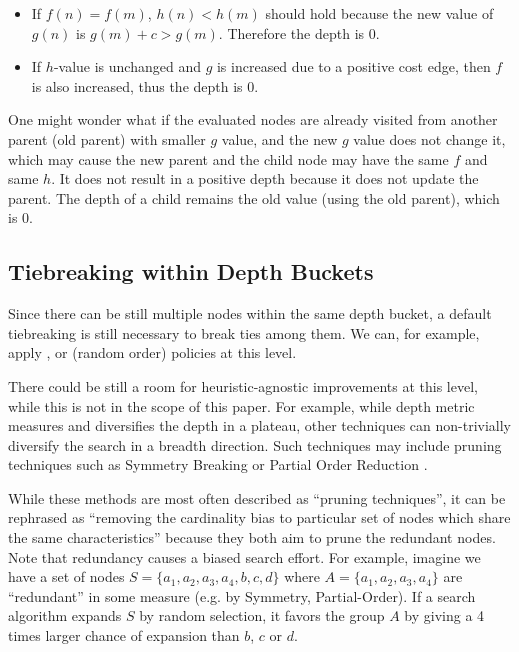\begin{itemize}
 \item 
       If $f(n)=f(m)$, $h(n)<h(m)$ should hold because the new value of
       $g(n)$ is $g(m)+c>g(m)$. Therefore the depth is 0.
 \item If $h$-value is unchanged and $g$ is increased due to a positive
       cost edge, then $f$ is also increased, thus the depth is 0.
\end{itemize}

One might wonder what if the evaluated nodes are already visited from
another parent (old parent) with smaller $g$ value, and the new $g$ value does not change it,
which may cause the new parent and the child node may have the same $f$ and
same $h$. It does not result in a positive depth because it does not update the parent. The depth of a
child remains the old value (using the old parent), which is 0.


\subsection{Tiebreaking within Depth Buckets}

Since there can be still multiple nodes within the same depth bucket, a
default tiebreaking is still necessary to break ties among them.
We can, for example, apply \lifo, \fifo or \ro (random order) policies
at this level.

There could be still a room for heuristic-agnostic improvements at
this level, while this is not in the scope of this paper.
For example, while depth metric measures and diversifies the depth in a plateau,
other techniques can non-trivially diversify the search in a breadth direction.
Such techniques may include pruning techniques such as 
Symmetry Breaking \cite{Fox1998,pochter2011exploiting,domshlak2013symmetry}
or Partial Order Reduction \cite{hall2013faster,wehrle2013relative}.

While these methods are most often described as ``pruning techniques'',
it can be rephrased as ``removing the cardinality bias to particular set
of nodes which share the same characteristics'' because they both aim to
prune the redundant nodes. Note that redundancy causes a biased 
search effort. For example, imagine we have a
set of nodes $S=\{a_1, a_2, a_3, a_4, b, c, d\}$ where
$A=\{a_1, a_2, a_3, a_4\}$ are ``redundant'' in some measure (e.g. by Symmetry,
Partial-Order). 
If a search algorithm expands $S$ by random selection, it favors the
group $A$ by giving a 4 times larger chance of expansion than $b$,
$c$ or $d$.

